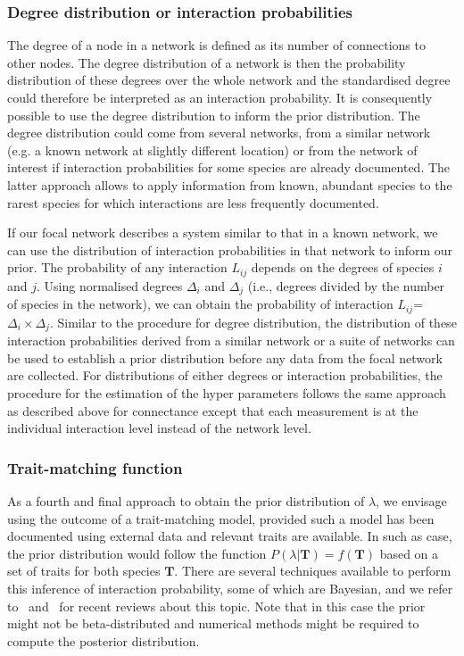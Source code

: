 \documentclass[12pt]{article}
\begin{document}
\begin{spacing}{2.0}
      \subsubsection*{Degree distribution or interaction probabilities}

          The degree of a node in a network is defined as its number of connections to other nodes. The degree distribution of a network is then the probability distribution of these degrees over the whole network and the standardised degree could therefore be interpreted as an interaction probability. It is consequently possible to use the degree distribution to inform the prior distribution. The degree distribution could come from several networks, from a similar network (e.g. a known network at slightly different location) or from the network of interest if interaction probabilities for some species are already documented. The latter approach allows to apply information from known, abundant species to the rarest species for which interactions are less frequently documented. 


          If our focal network describes a system similar to that in a known network, we can use the distribution of interaction probabilities in that network to inform our prior. The probability of any interaction $L_{ij}$ depends on the degrees of species $i$ and $j$. Using normalised degrees $\Delta_i$ and $\Delta_j$ (i.e., degrees divided by the number of species in the network), we can obtain the probability of interaction $L_{ij}$=$\Delta_i\times\Delta_j$. Similar to the procedure for degree distribution, the distribution of these interaction probabilities derived from a similar network or a suite of networks can be used to establish a prior distribution before any data from the focal network are collected. For distributions of either degrees or interaction probabilities, the procedure for the estimation of the hyper parameters follows the same approach as described above for connectance except that each measurement is at the individual interaction level instead of the network level.


      \subsubsection*{Trait-matching function} 

          As a fourth and final approach to obtain the prior distribution of $\lambda$, we envisage using the outcome of a trait-matching model, provided such a model has been documented using external data and relevant traits are available. In such as case, the prior distribution would follow the function $P(\lambda|\mathbf{T})=f(\mathbf{T})$ based on a set of traits for both species $\mathbf{T}$. There are several techniques available to perform this inference of interaction probability, some of which are Bayesian, and we refer to~\citet{Bartomeus2016} and~\citet{Weinstein2017} for recent reviews about this topic. Note that in this case the prior might not be beta-distributed and numerical methods might be required to compute the posterior distribution.  



\end{spacing}
\end{document}
